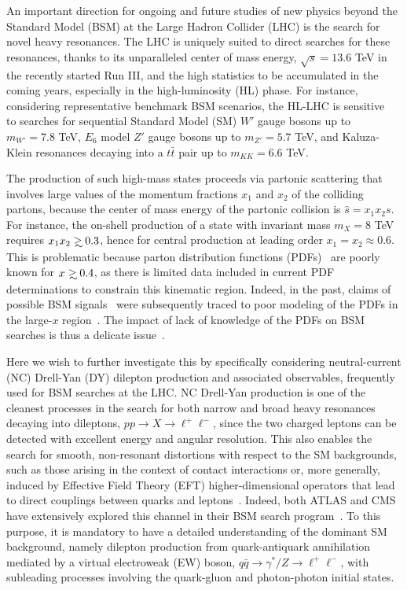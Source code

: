 
An important direction for ongoing and future studies of 
new physics beyond the Standard Model (BSM) at
the Large Hadron Collider (LHC) is the search for novel heavy resonances.
%
The LHC is uniquely suited to direct searches for these resonances,
thanks to its unparalleled center of mass energy, $\sqrt{s}=13.6$ TeV in the
recently started 
Run III, and the  high statistics to be accumulated in the coming years,
especially in the high-luminosity (HL)
phase.
%
For instance, considering representative
benchmark BSM scenarios, the HL-LHC is sensitive~\cite{CidVidal:2018eel} to 
searches for sequential Standard Model (SM) 
$W'$ gauge bosons 
up to $m_{W'}=7.8$ TeV, $E_6$ model $Z'$ gauge bosons up to $m_{Z'}=5.7$ TeV, and
Kaluza-Klein resonances decaying into a $t\bar{t}$ pair up to
$m_{KK}=6.6$ TeV.

The production of such high-mass states proceeds via partonic
scattering that involves large 
values of the momentum fractions $x_1$ and $x_2$ of the colliding
partons, because the center of mass energy of the partonic collision
is $\hat s= x_1 x_2 s$.
%
For instance, the on-shell production  of a state
with invariant mass $m_{X}=8$ TeV requires
$x_1x_2 \gsim 0.3 $, hence for central production at leading order
$x_1=x_2\approx 0.6$. This is problematic because parton distribution functions
(PDFs)~\cite{Gao:2017yyd,Kovarik:2019xvh} are poorly known for $x\gsim
0.4$, as there is limited data
included in current PDF determinations to constrain this kinematic region.
%
Indeed, in the past, claims of possible BSM signals~\cite{CDF:1996yow} 
were subsequently traced to poor modeling of the PDFs in the large-$x$
region~\cite{Lai:1996mg}.
%
The impact of lack of knowledge of the PDFs
on BSM searches is thus a delicate issue~\cite{Beenakker:2015rna}.

Here we wish to further investigate this by specifically considering
neutral-current (NC) Drell-Yan (DY) dilepton production and associated
observables, frequently  used for BSM searches at the LHC.
%
NC Drell-Yan production
is one of the cleanest processes in the search for  both narrow and
broad heavy resonances decaying into dileptons,
$pp \to X \to \ell^+\ell^-$, since 
the two charged leptons can be detected with excellent energy and
angular resolution.
%
This also enables the search for
smooth, non-resonant distortions with respect to the SM
backgrounds, such as those arising in the context of contact interactions 
or, more generally,
induced by Effective Field Theory
(EFT) higher-dimensional operators that lead to 
direct couplings between quarks and leptons~\cite{Ethier:2021bye,Dawson:2018dxp,Ellis:2020unq,Greljo:2021kvv}.
Indeed, both ATLAS
and CMS have extensively explored this channel in their BSM search
program~\cite{ATLAS:2014gys,ATLAS:2020yat,ATLAS:2019erb,CMS:2021ctt,ATLAS:2021mla,CMS:2018nlk}.
To this purpose, it is mandatory to have a detailed understanding of
the dominant SM background, namely dilepton
production from quark-antiquark annihilation mediated by
a virtual electroweak (EW) boson, $q\bar{q} \to  \gamma^*/Z \to \ell^+\ell^-$,
with subleading processes involving the quark-gluon
and photon-photon initial states.

